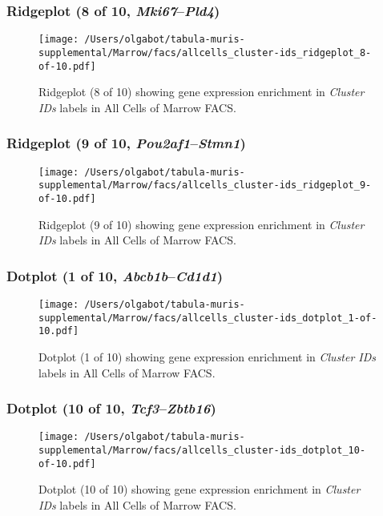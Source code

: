 \clearpage

\subsubsection{Ridgeplot (8 of 10, \emph{Mki67}--\emph{Pld4})}
\begin{figure}[h]
\centering
\texttt{[image: /Users/olgabot/tabula-muris-supplemental/Marrow/facs/allcells\_cluster-ids\_ridgeplot\_8-of-10.pdf]}

\caption{ Ridgeplot (8 of 10)  showing gene expression enrichment in \emph{Cluster IDs} labels in All Cells of Marrow FACS. }
\end{figure}


\clearpage

\subsubsection{Ridgeplot (9 of 10, \emph{Pou2af1}--\emph{Stmn1})}
\begin{figure}[h]
\centering
\texttt{[image: /Users/olgabot/tabula-muris-supplemental/Marrow/facs/allcells\_cluster-ids\_ridgeplot\_9-of-10.pdf]}

\caption{ Ridgeplot (9 of 10)  showing gene expression enrichment in \emph{Cluster IDs} labels in All Cells of Marrow FACS. }
\end{figure}


\clearpage

\subsubsection{Dotplot (1 of 10, \emph{Abcb1b}--\emph{Cd1d1})}
\begin{figure}[h]
\centering
\texttt{[image: /Users/olgabot/tabula-muris-supplemental/Marrow/facs/allcells\_cluster-ids\_dotplot\_1-of-10.pdf]}

\caption{ Dotplot (1 of 10)  showing gene expression enrichment in \emph{Cluster IDs} labels in All Cells of Marrow FACS. }
\end{figure}


\clearpage

\subsubsection{Dotplot (10 of 10, \emph{Tcf3}--\emph{Zbtb16})}
\begin{figure}[h]
\centering
\texttt{[image: /Users/olgabot/tabula-muris-supplemental/Marrow/facs/allcells\_cluster-ids\_dotplot\_10-of-10.pdf]}

\caption{ Dotplot (10 of 10)  showing gene expression enrichment in \emph{Cluster IDs} labels in All Cells of Marrow FACS. }
\end{figure}


